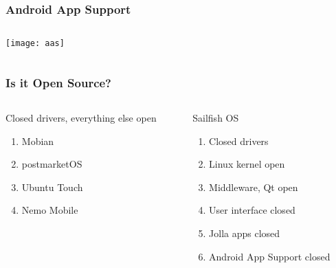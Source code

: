 \documentclass[
	notes=none,
	aspectratio=169
]{beamer}
\begin{document}

\begin{frame}
\frametitle{Android App Support}

\begin{columns}[T]
\begin{column}[T]{1.0\textwidth}
\setlength{\parskip}{0.5em}

\begin{column}[T]{1.0\textwidth}

\vspace{0.5cm}
\texttt{[image: aas]}

\end{column}

\end{column}
\end{columns}

\end{frame}
\note{
}


\begin{frame}
\frametitle{Is it Open Source?}

\begin{columns}[T]
\begin{column}[T]{0.5\textwidth}
\setlength{\parskip}{0.5em}

\vspace{0.4cm}
Closed drivers, everything else open
\begin{enumerate}
\setlength{\parskip}{0.5em}
\item Mobian
\item postmarketOS
\item Ubuntu Touch
\item Nemo Mobile
\end{enumerate}

\end{column}
\begin{column}[T]{0.5\textwidth}
\setlength{\parskip}{0.5em}

\vspace{0.4cm}
Sailfish OS
\begin{enumerate}
\setlength{\parskip}{0.5em}
\item Closed drivers
\item Linux kernel open
\item Middleware, Qt open
\item User interface closed
\item Jolla apps closed
\item Android App Support closed
\end{enumerate}

\end{column}
\end{columns}

\end{frame}
\note{
}
\end{document}
